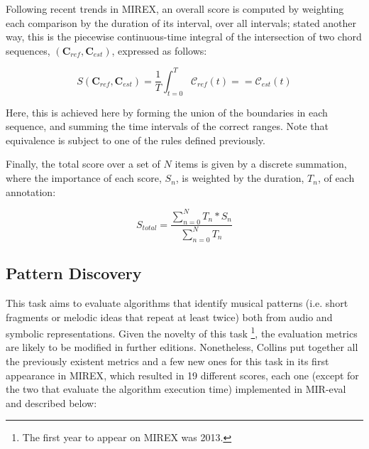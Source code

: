 \documentclass{article}
\begin{document}
Following recent trends in MIREX, an overall score is computed by weighting each comparison by the duration of its interval, over all intervals; stated another way, this is the piecewise continuous-time integral of the intersection of two chord sequences, $(\mathbf{C}_{ref}, \mathbf{C}_{est})$, expressed as follows:

\begin{equation}
S(\mathbf{C}_{ref}, \mathbf{C}_{est}) = \frac{1}{T}\int_{t=0}^{T} \mathcal{C}_{ref}(t) == \mathcal{C}_{est}(t)
\end{equation}

\noindent Here, this is achieved here by forming the union of the boundaries in each sequence, and summing the time intervals of the correct ranges. Note that equivalence is subject to one of the rules defined previously. 

Finally, the total score over a set of $N$ items is given by a discrete summation, where the importance of each score, $S_n$, is weighted by the duration, $T_n$, of each annotation:

\begin{equation}
S_{total} = \frac{\sum_{n=0}^{N} T_n*S_n}{\sum_{n=0}^{N} T_n}
\end{equation}
 
\subsection{Pattern Discovery}

This task aims to evaluate algorithms that identify musical patterns (i.e. short fragments or melodic ideas that repeat at least twice) both from audio and symbolic representations.
Given the novelty of this task \footnote{The first year to appear on MIREX was 2013.}, the evaluation metrics are likely to be modified in further editions.
Nonetheless, Collins put together all the previously existent metrics and a few new ones for this task in its first appearance in MIREX\cite{Collins2013}, which resulted in 19 different scores, each one (except for the two that evaluate the algorithm execution time) implemented in MIR-eval and described below:
\end{document}
